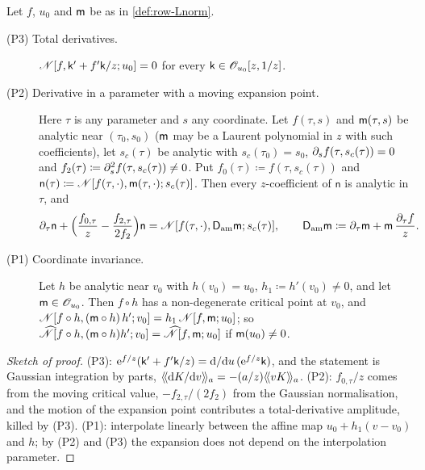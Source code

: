 \begin{prop}
\label{prop:row-calc}
Let $f$, $u_0$ and $\mathsf{m}$ be as in \cref{def:row-Lnorm}.
\begin{description}
\item[(P3) Total derivatives.] $\mathscr{N}[f,\mathsf{k}'+f'\mathsf{k}/z;u_0]=0$ for every $\mathsf{k}\in\mathscr{O}_{u_0}[z,1/z]$.
\item[(P2) Derivative in a parameter with a moving expansion point.] Here $\tau$ is any parameter and $s$ any coordinate. Let $f(\tau,s)$ and $\mathsf{m}(\tau,s)$ be analytic near $(\tau_0,s_0)$ ($\mathsf{m}$ may be a Laurent polynomial in $z$ with such coefficients), let $s_c(\tau)$ be analytic with $s_c(\tau_0)=s_0$, $\partial_sf(\tau,s_c(\tau))=0$ and $f_2(\tau)\coloneqq\partial_s^2f(\tau,s_c(\tau))\neq0$. Put $f_0(\tau)\coloneqq f(\tau,s_c(\tau))$ and $\mathsf{n}(\tau)\coloneqq\mathscr{N}[f(\tau,\cdot),\mathsf{m}(\tau,\cdot);s_c(\tau)]$. Then every $z$-coefficient of $\mathsf{n}$ is analytic in $\tau$, and
\begin{equation}
\label{eq:row-P2}
\partial_\tau\mathsf{n}+\Big(\frac{f_{0,\tau}}{z}-\frac{f_{2,\tau}}{2f_2}\Big)\mathsf{n}=\mathscr{N}[f(\tau,\cdot),\mathsf{D}_{\mathrm{am}}\mathsf{m};s_c(\tau)],\qquad \mathsf{D}_{\mathrm{am}}\mathsf{m}\coloneqq\partial_\tau\mathsf{m}+\mathsf{m}\,\frac{\partial_\tau f}{z}.
\end{equation}
\item[(P1) Coordinate invariance.] Let $h$ be analytic near $v_0$ with $h(v_0)=u_0$, $h_1\coloneqq h'(v_0)\neq0$, and let $\mathsf{m}\in\mathscr{O}_{u_0}$. Then $f\circ h$ has a non-degenerate critical point at $v_0$, and $\mathscr{N}[f\circ h,(\mathsf{m}\circ h)\,h';v_0]=h_1\,\mathscr{N}[f,\mathsf{m};u_0]$; so $\widehat{\mathscr{N}}[f\circ h,(\mathsf{m}\circ h)h';v_0]=\widehat{\mathscr{N}}[f,\mathsf{m};u_0]$ if $\mathsf{m}(u_0)\neq0$.
\end{description}
\end{prop}

\begin{proof}[Sketch of proof]
(P3): $\mathrm{e}^{f/z}(\mathsf{k}'+f'\mathsf{k}/z)=\mathrm{d}/\mathrm{d} u\,(\mathrm{e}^{f/z}\mathsf{k})$, and the statement is Gaussian integration by parts, $\langle\!\langle \mathrm{d} K/\mathrm{d} v\rangle\!\rangle_{a}=-(a/z)\langle\!\langle vK\rangle\!\rangle_{a}$. (P2): $f_{0,\tau}/z$ comes from the moving critical value, $-f_{2,\tau}/(2f_2)$ from the Gaussian normalisation, and the motion of the expansion point contributes a total-derivative amplitude, killed by (P3). (P1): interpolate linearly between the affine map $u_0+h_1(v-v_0)$ and $h$; by (P2) and (P3) the expansion does not depend on the interpolation parameter.
\end{proof}

